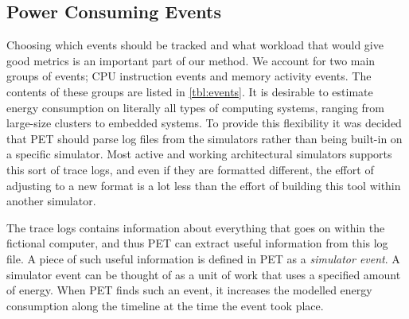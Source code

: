 \subsection{Power Consuming Events}
\label{subsec:powerevents}

Choosing which events should be tracked and what workload that would give good
metrics is an important part of our method. We account for two main groups of
events; CPU instruction events and memory activity events. The contents of these
groups are listed in \autoref{tbl:events}. It is desirable to estimate energy
consumption on literally all types of computing systems, ranging from large-size
clusters to embedded systems. To provide this flexibility it was decided that
PET should parse log files from the simulators rather than being built-in on a
specific simulator. Most active and working architectural simulators supports this
sort of trace logs, and even if they are formatted different, the effort of
adjusting to a new format is a lot less than the effort of building this tool
within another simulator.

The trace logs contains information about everything that goes on within the
fictional computer, and thus PET can extract useful information from this log
file. A piece of such useful information is defined in PET as a \emph{simulator
event}. A simulator event can be thought of as a unit of work that uses a
specified amount of energy. When PET finds such an event, it increases the
modelled energy consumption along the timeline at the time the event took place.

